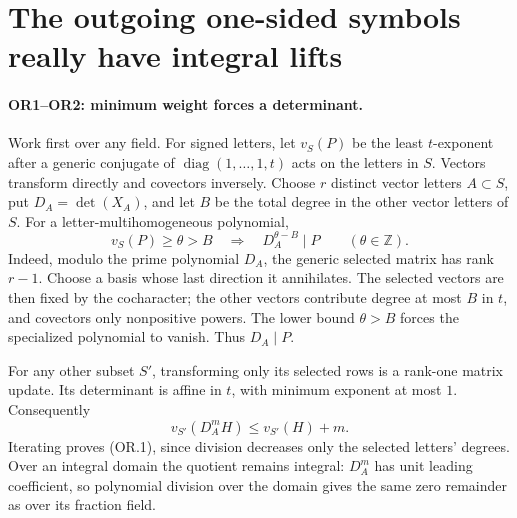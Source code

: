 \section{The outgoing one-sided symbols really have integral lifts}
\label{sec:outgoing-realization}


\paragraph{OR1--OR2: minimum weight forces a determinant.}
Work first over any field. For signed letters, let $v_S(P)$ be the least
$t$-exponent after a generic conjugate of
$\operatorname{diag}(1,\ldots,1,t)$ acts on the letters in $S$.
Vectors transform directly and covectors inversely. Choose $r$ distinct
vector letters $A\subset S$, put $D_A=\det(X_A)$, and let
$B$ be the total degree in the other vector letters of $S$.
For a letter-multihomogeneous polynomial,
\[
 v_S(P)\ge\theta>B
 \quad\Longrightarrow\quad D_A^{\theta-B}\mid P
 \qquad(\theta\in\mathbb Z).                              \tag{OR.1}
\]
Indeed, modulo the prime polynomial $D_A$, the generic selected matrix has
rank $r-1$. Choose a basis whose last direction it annihilates. The selected
vectors are then fixed by the cocharacter; the other vectors contribute
degree at most $B$ in $t$, and covectors only nonpositive powers.
The lower bound $\theta>B$ forces the specialized polynomial to vanish.
Thus $D_A\mid P$.

For any other subset $S'$, transforming only its selected rows is a
rank-one matrix update. Its determinant is affine in $t$, with minimum
exponent at most $1$. Consequently
\[
 v_{S'}(D_A^mH)\le v_{S'}(H)+m.                           \tag{OR.2}
\]
Iterating proves (OR.1), since division decreases only the selected
letters' degrees. Over an integral domain the quotient remains integral:
$D_A^m$ has unit leading coefficient, so polynomial division over the
domain gives the same zero remainder as over its fraction field.

